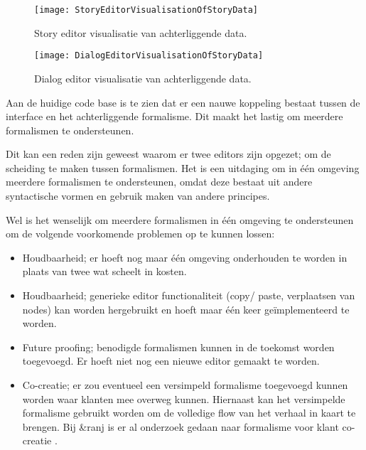 
\begin{figure}[htb]
    \centering
    \texttt{[image: StoryEditorVisualisationOfStoryData]}
    \caption{Story editor visualisatie van achterliggende data.}
    \label{fig:storyeditorvisualisationofstorydata}
\end{figure}

\begin{figure}[htb]
    \centering
    \texttt{[image: DialogEditorVisualisationOfStoryData]}
    \caption{Dialog editor visualisatie van achterliggende data.}
    \label{fig:dialogeditorvisualisationofstorydata}
\end{figure}

Aan de huidige code base is te zien dat er een nauwe koppeling bestaat tussen de interface en het achterliggende formalisme. Dit maakt het lastig om meerdere formalismen te ondersteunen.

Dit kan een reden zijn geweest waarom er twee editors zijn opgezet; om de scheiding te maken tussen formalismen. Het is een uitdaging om in één omgeving meerdere formalismen te ondersteunen, omdat deze bestaat uit andere syntactische vormen en gebruik maken van andere principes.

Wel is het wenselijk om meerdere formalismen in één omgeving te ondersteunen om de volgende voorkomende problemen op te kunnen lossen:

\begin{itemize}
    \item Houdbaarheid; er hoeft nog maar één omgeving onderhouden te worden in plaats van twee wat scheelt in kosten.
    \item Houdbaarheid; generieke editor functionaliteit (copy/ paste, verplaatsen van nodes) kan worden hergebruikt en hoeft maar één keer geïmplementeerd te worden.
    \item Future proofing; benodigde formalismen kunnen in de toekomst worden toegevoegd. Er hoeft niet nog een nieuwe editor gemaakt te worden.
    \item Co-creatie; er zou eventueel een versimpeld formalisme toegevoegd kunnen worden waar klanten mee overweg kunnen. Hiernaast kan het versimpelde formalisme gebruikt worden om de volledige flow van het verhaal in kaart te brengen. Bij \&ranj is er al onderzoek gedaan naar formalisme voor klant co-creatie \cite{Schipper2015}.
\end{itemize}

